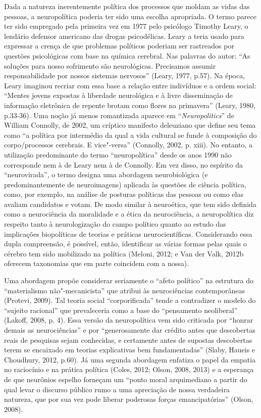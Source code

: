 Dada a natureza inerentemente política dos processos que moldam as vidas
das pessoas, a neuropolítica poderia ter sido uma escolha apropriada. O
termo parece ter sido empregado pela primeira vez em 1977 pelo psicólogo
Timothy Leary, o lendário defensor americano das drogas psicodélicas.
Leary a teria usado para expressar a crença de que problemas políticos
poderiam ser rastreados por questões psicológicas com base na química
cerebral. Nas palavras do autor: ``As soluções para nosso sofrimento são
neurológicas. Precisamos assumir responsabilidade por nossos sistemas
nervosos'' (Leary, 1977, p.57). Na época, Leary imaginou recriar com
essa base a relação entre indivíduos e a ordem social: ``Mentes jovens
expostas à liberdade neurológica e à livre disseminação de informação
eletrônica de repente brotam como flores na primavera'' (Leary, 1980,
p.33-36). Uma noção já menos romantizada aparece em
``\emph{Neuropolitics}'' de William Connolly, de 2002, um críptico
manifesto deleuziano que define seu tema como ``a política por
intermédio da qual a vida cultural se funde à composição do
corpo/processos cerebrais. E vice"-versa'' (Connolly, 2002, p. xiii). No
entanto, a utilização predominante do termo ``neuropolítica'' desde os
anos 1990 não corresponde nem à de Leary nem à de Connolly. Em vez
disso, no espírito da ``neurovirada'', o termo designa uma abordagem
neurobiológica (e predominantemente de neuroimagens) aplicada às
questões de ciência política, como, por exemplo, na análise de posturas
políticas das pessoas ou como elas avaliam candidatos e votam. De modo
similar à neuroética, que tem sido definida como a neurociência da
moralidade e a ética da neurociência, a neuropolítica diz respeito tanto
à neurologização do campo político quanto ao estudo das implicações
biopolíticas de teorias e práticas neurocientíficas. Considerando essa
dupla compreensão, é possível, então, identificar as várias formas pelas
quais o cérebro tem sido mobilizado na política (Meloni, 2012; e Van der
Valk, 2012b oferecem taxonomias que em parte coincidem com a nossa).

Uma abordagem propõe considerar seriamente o ``afeto político'' na
estrutura do ``materialismo não"-mecanicista'' que atribui às
neurociências contemporâneas (Protevi, 2009). Tal teoria social
``corporificada'' tende a contradizer o modelo do ``sujeito racional''
que prevaleceria como a base do ``pensamento neoliberal'' (Lakoff, 2008,
p. 4). Essa versão da neuropolítica vem sido criticada por ``honrar
demais as neurociências'' e por ``generosamente dar crédito antes que
descobertas reais de pesquisas sejam conhecidas, e certamente antes de
supostas descobertas terem se encaixado em teorias explicativas bem
fundamentadas'' (Slaby, Haueis e Choudhury, 2012, p.60). Já uma segunda
abordagem enfatiza o papel da empatia no raciocínio e na prática
política (Coles, 2012; Olson, 2008, 2013) e a esperança de que neurônios
espelho forneçam um ``ponto moral arquimediano a partir do qual levar o
discurso público rumo a uma apreciação de nossa verdadeira natureza, que
por sua vez pode liberar poderosas forças emancipatórias'' (Olson,
2008).

